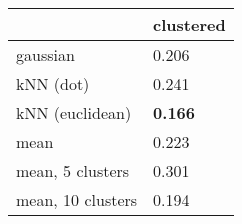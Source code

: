 \begin{tabular}{ll}
\toprule
                  & clustered\\
\midrule
gaussian          & 0.206\\
kNN (dot)         & 0.241\\
kNN (euclidean)   & \textbf{0.166}\\
mean              & 0.223\\
mean, 5 clusters  & 0.301\\
mean, 10 clusters & 0.194\\
\bottomrule
\end{tabular}
